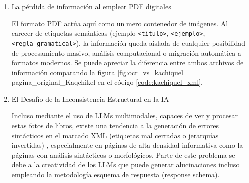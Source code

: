 \begin{enumerate}
    \begin{itemize}
        \item Sistemas de numeración jerárquica: 
        
        Divisiones en secciones, tablas y disposiciones en vertical que suelen confundirse con el texto horizontal.
        \item Glosas y ejemplos multilingües: 
        
        La alternancia entre el castellano y la lengua maya, a menudo en bloques adyacentes, que el OCR estándar tiende a mezclar al no reconocer los límites visuales de las columnas o tablas.
        \item Estructuras morfológicas complejas: 
        
        Paradigmas verbales que, al ser extraídos de una foto como texto plano, se convierten en caracteres inconexos.
        \item Estructuras sintácticas de subrayado: 
        
        Interpretaciones de segmentos de las oraciones subrayadas mediante análisis sintáctico.
        \item Texto sobrante: 
        
        A menudo al escanear un libro se recogen en la imagenes caracteres de las páginas adyacentes, manchas que dificultan la identificación de las letras, dibujos decorativos a inicio de página…
    \end{itemize}

    \item La pérdida de información al emplear PDF digitales
    
    El formato PDF actúa aquí como un mero contenedor de imágenes. Al carecer de etiquetas semánticas (ejemplo \verb|<titulo>|, \verb|<ejemplo>|, \verb|<regla_gramatical>|), la información queda aislada de cualquier posibilidad de procesamiento masivo, análisis computacional o migración automática a formatos modernos. Se puede apreciar la diferencia entre ambos archivos de información comparando la figura \ref{fig:ocr_vs_kachiquel} pagina\_original\_Kaqchikel en el código \ref{code:kachiquel_xml}.

    \item El Desafío de la Inconsistencia Estructural en la IA 
    
    Incluso mediante el uso de LLMs multimodales, capaces de ver y procesar estas fotos de libros, existe una tendencia a la generación de errores sintácticos en el marcado XML (etiquetas mal cerradas o jerarquías invertidas) \parencite{10832176}, especialmente en páginas de alta densidad informativa como la páginas con análisis sintácticos o morfológicos.
    Parte de este problema se debe a la creatividad de los LLMs que puede generar alucinaciones incluso empleando la metodología esquema de respuesta (response schema).

\end{enumerate}



